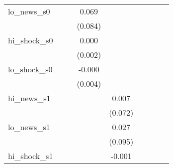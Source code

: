 {\begin{tabular}{l*{8}{c}}
\addlinespace
lo\_news\_s0  &                     &                     &       0.069         &                     &                     &                     &                     &                     \\
            &                     &                     &     (0.084)         &                     &                     &                     &                     &                     \\
\addlinespace
hi\_shock\_s0 &                     &                     &       0.000         &                     &                     &                     &                     &                     \\
            &                     &                     &     (0.002)         &                     &                     &                     &                     &                     \\
\addlinespace
lo\_shock\_s0 &                     &                     &      -0.000         &                     &                     &                     &                     &                     \\
            &                     &                     &     (0.004)         &                     &                     &                     &                     &                     \\
\addlinespace
hi\_news\_s1  &                     &                     &                     &       0.007         &                     &                     &                     &                     \\
            &                     &                     &                     &     (0.072)         &                     &                     &                     &                     \\
\addlinespace
lo\_news\_s1  &                     &                     &                     &       0.027         &                     &                     &                     &                     \\
            &                     &                     &                     &     (0.095)         &                     &                     &                     &                     \\
\addlinespace
hi\_shock\_s1 &                     &                     &                     &      -0.001         &                     &                     &                     &                     \\

\end{tabular}}
